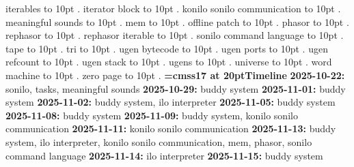 \smallskip
\noindent iterables \leaders\hbox to 10pt {\hss.\hss}  \hfill {}
\smallskip
\noindent iterator block \leaders\hbox to 10pt {\hss.\hss}  \hfill {}
\smallskip
\noindent konilo sonilo communication \leaders\hbox to 10pt {\hss.\hss}  \hfill {}
\smallskip
\noindent meaningful sounds \leaders\hbox to 10pt {\hss.\hss}  \hfill {}
\smallskip
\noindent mem \leaders\hbox to 10pt {\hss.\hss}  \hfill {}
\smallskip
\noindent offline patch \leaders\hbox to 10pt {\hss.\hss}  \hfill {}
\smallskip
\noindent phasor \leaders\hbox to 10pt {\hss.\hss}  \hfill {}
\smallskip
\noindent rephasor \leaders\hbox to 10pt {\hss.\hss}  \hfill {}
\smallskip
\noindent rephasor iterable \leaders\hbox to 10pt {\hss.\hss}  \hfill {}
\smallskip
\noindent sonilo command language \leaders\hbox to 10pt {\hss.\hss}  \hfill {}
\smallskip
\noindent tape \leaders\hbox to 10pt {\hss.\hss}  \hfill {}
\smallskip
\noindent tri \leaders\hbox to 10pt {\hss.\hss}  \hfill {}
\smallskip
\noindent ugen bytecode \leaders\hbox to 10pt {\hss.\hss}  \hfill {}
\smallskip
\noindent ugen ports \leaders\hbox to 10pt {\hss.\hss}  \hfill {}
\smallskip
\noindent ugen refcount \leaders\hbox to 10pt {\hss.\hss}  \hfill {}
\smallskip
\noindent ugen stack \leaders\hbox to 10pt {\hss.\hss}  \hfill {}
\smallskip
\noindent ugens \leaders\hbox to 10pt {\hss.\hss}  \hfill {}
\smallskip
\noindent universe \leaders\hbox to 10pt {\hss.\hss}  \hfill {}
\smallskip
\noindent word machine \leaders\hbox to 10pt {\hss.\hss}  \hfill {}
\smallskip
\noindent zero page \leaders\hbox to 10pt {\hss.\hss}  \hfill {}
\smallskip
\vfill \break
{\medskip\noindent\bf\font\titlefont=cmss17 at 20pt\titlefont Timeline}\medskip
{\noindent \bf 2025-10-22:} sonilo, tasks, meaningful sounds\smallskip
{\noindent \bf 2025-10-29:} buddy system\smallskip
{\noindent \bf 2025-11-01:} buddy system\smallskip
{\noindent \bf 2025-11-02:} buddy system, ilo interpreter\smallskip
{\noindent \bf 2025-11-05:} buddy system\smallskip
{\noindent \bf 2025-11-08:} buddy system\smallskip
{\noindent \bf 2025-11-09:} buddy system, konilo sonilo communication\smallskip
{\noindent \bf 2025-11-11:} konilo sonilo communication\smallskip
{\noindent \bf 2025-11-13:} buddy system, ilo interpreter, konilo sonilo communication, mem, phasor, sonilo command language\smallskip
{\noindent \bf 2025-11-14:} ilo interpreter\smallskip
{\noindent \bf 2025-11-15:} buddy system\smallskip
